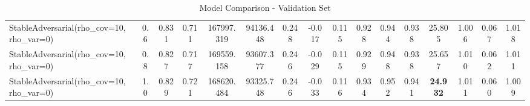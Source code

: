 \documentclass[11pt]{article}
\theoremstyle{plain}
\theoremstyle{definition}
\newcommand{\1}{\mathbf{1}}
\begin{document}
\begin{table}[h]
{\begin{tabular}{lccccccccccccccc}
StableAdversarial(rho\_cov=10, rho\_var=0) & 0.6 & 0.831 & 0.711 & 167997.319 & 94136.448 & 0.248 & -0.017 & 0.115 & 0.928 & 0.944 & 0.938 & 25.805 & 1.006 & 0.067 & 1.018 \\
StableAdversarial(rho\_cov=10, rho\_var=0) & 0.8 & 0.827 & 0.717 & 169559.158 & 93607.377 & 0.246 & -0.029 & 0.115 & 0.929 & 0.948 & 0.938 & 25.657 & 1.010 & 0.062 & 1.011 \\
StableAdversarial(rho\_cov=10, rho\_var=0) & 1.0 & 0.829 & 0.721 & 168620.484 & 93325.748 & 0.246 & -0.033 & 0.116 & 0.934 & 0.952 & 0.941 & \textbf{24.932} & 1.011 & 0.060 & 1.009 \\
\bottomrule
\end{tabular}%
}
\caption{Model Comparison - Validation Set}
\end{table}

\newpage
\end{document}
